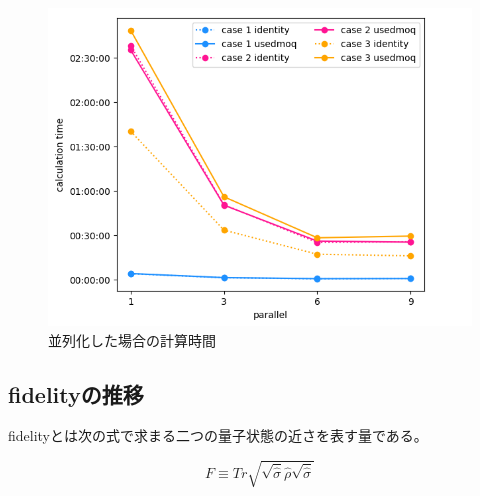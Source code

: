 \documentclass[11pt,a4j,notitlepage]{jreport}
\begin{document}
	\begin{figure}[htbp]
		\centering
			\includegraphics[clip,width=12.0cm]{./picture/parallel.png}
			\caption{並列化した場合の計算時間}
	\end{figure}

	\newpage

	\subsection*{fidelityの推移}

	fidelityとは次の式で求まる二つの量子状態の近さを表す量である。

	\begin{equation}
		F \equiv Tr \sqrt{\sqrt{\hat{\sigma}} \hat{\rho} \sqrt{\hat{\sigma}}}
	\end{equation}
\end{document}
